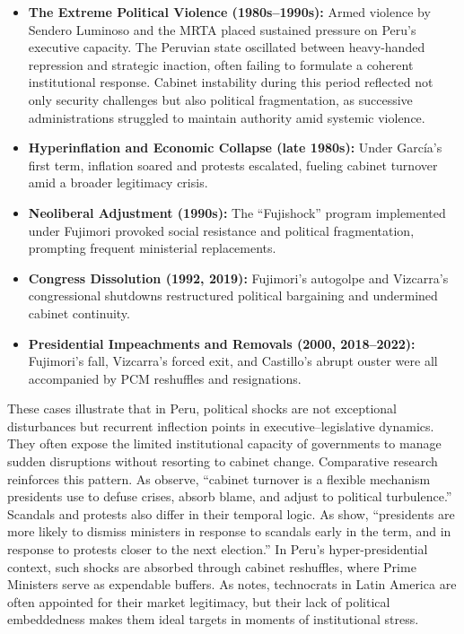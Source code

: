 \documentclass[a4paper, 12pt]{article}
\begin{document}
\begin{itemize}
  \item \textbf{The Extreme Political Violence (1980s–1990s):} Armed violence by Sendero Luminoso and the MRTA placed sustained pressure on Peru’s executive capacity. The Peruvian state oscillated between heavy-handed repression and strategic inaction, often failing to formulate a coherent institutional response. Cabinet instability during this period reflected not only security challenges but also political fragmentation, as successive administrations struggled to maintain authority amid systemic violence.
  \item \textbf{Hyperinflation and Economic Collapse (late 1980s):} Under García’s first term, inflation soared and protests escalated, fueling cabinet turnover amid a broader legitimacy crisis.
  \item \textbf{Neoliberal Adjustment (1990s):} The ``Fujishock'' program implemented under Fujimori provoked social resistance and political fragmentation, prompting frequent ministerial replacements.
  \item \textbf{Congress Dissolution (1992, 2019):} Fujimori's autogolpe and Vizcarra’s congressional shutdowns restructured political bargaining and undermined cabinet continuity.
  \item \textbf{Presidential Impeachments and Removals (2000, 2018–2022):} Fujimori’s fall, Vizcarra’s forced exit, and Castillo’s abrupt ouster were all accompanied by PCM reshuffles and resignations.
\end{itemize}

These cases illustrate that in Peru, political shocks are not exceptional disturbances but recurrent inflection points in executive–legislative dynamics. They often expose the limited institutional capacity of governments to manage sudden disruptions without resorting to cabinet change. Comparative research reinforces this pattern. As \citet[609]{camerlo_minister_2015-1} observe, ``cabinet turnover is a flexible mechanism presidents use to defuse crises, absorb blame, and adjust to political turbulence.'' Scandals and protests also differ in their temporal logic. As \citet[611]{camerlo_minister_2015-1} show, ``presidents are more likely to dismiss ministers in response to scandals early in the term, and in response to protests closer to the next election.'' In Peru’s hyper-presidential context, such shocks are absorbed through cabinet reshuffles, where Prime Ministers serve as expendable buffers. As \citet[7-9]{dargent_technocracy_2014} notes, technocrats in Latin America are often appointed for their market legitimacy, but their lack of political embeddedness makes them ideal targets in moments of institutional stress.
\end{document}
